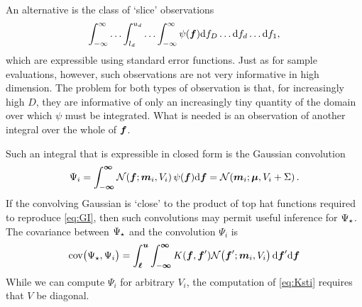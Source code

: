 \documentclass[twoside]{article}
\newcommand{\vm}{\vect{m}}
\newcommand{\vu}{\vect{u}}
\newcommand{\vinf}{\vect{\infty}}
\begin{document}
An alternative is the class of `slice' observations 
\begin{equation}
 \int_{-\infty}^{\infty} \ldots \int_{l_d}^{u_d} \ldots \int_{-\infty}^{\infty} \psi(\boldsymbol{f}) \mathrm{d} f_D \ldots \mathrm{d} f_d\ldots \mathrm{d} f_1,
\end{equation}
which are expressible using standard error functions. Just as for sample evaluations, however, such observations are not very informative in high dimension. The problem for both types of observation is that, for increasingly high $D$, they are informative of only an increasingly tiny quantity of the domain over which $\psi$ must be integrated. What is needed is an observation of another integral over the whole of $\boldsymbol{f}$.

Such an integral that is expressible in closed form is the Gaussian convolution
 \begin{equation}\label{eq:conv}
 \Psi_i = \int_{-\vinf}^{\vinf} \N{\vf}{\vm_i}{V_i} \psi(\vf) \ud \vf = \N{\vm_i}{\vmu}{V_i+\Sigma}.
\end{equation}
 If the convolving Gaussian is `close' to the product of top hat functions required to reproduce \eqref{eq:GI}, then such convolutions may permit useful inference for $\Psi_\star$. The covariance between $\Psi_\star$ and the convolution $\Psi_i$ is
\begin{align}\label{eq:Ksti}
\text{cov}\bigl(\Psi\st, \Psi_i\bigr) =
\int_{\vl}^{\vu} \int_{-\vinf}^{\vinf}  K(\vf, \vf') \N{\vf'}{\vm_i}{V_i} \ud \vf' \ud \vf 
\end{align}
While we can compute $\Psi_i$ for arbitrary $V_i$, the computation of \eqref{eq:Ksti} requires that $V$ be diagonal. 








\end{document}
